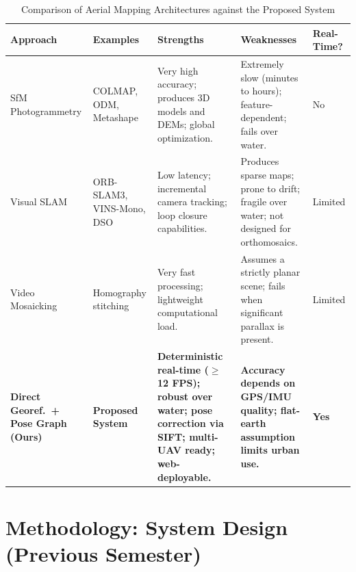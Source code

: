 \documentclass[conference]{IEEEtran}
\begin{document}
\begin{table}[ht]
    \centering
    \caption{Comparison of Aerial Mapping Architectures against the Proposed System}
    \label{tab:mapping_comparison}
    \small
    \renewcommand{\arraystretch}{1.2}
    \begin{tabularx}{\textwidth}{@{} p{2.8cm} p{2.2cm} X X l @{}}
        \toprule
        \textbf{Approach} & \textbf{Examples} & \textbf{Strengths} & \textbf{Weaknesses} & \textbf{Real-Time?} \\
        \midrule

        SfM Photogrammetry &
        COLMAP, ODM, Metashape &
        Very high accuracy; produces 3D models and DEMs; global optimization. &
        Extremely slow (minutes to hours); feature-dependent; fails over water. &
        No \\
        \addlinespace

        Visual SLAM &
        ORB-SLAM3, VINS-Mono, DSO &
        Low latency; incremental camera tracking; loop closure capabilities. &
        Produces sparse maps; prone to drift; fragile over water; not designed for orthomosaics. &
        Limited \\
        \addlinespace

        Video Mosaicking &
        Homography stitching &
        Very fast processing; lightweight computational load. &
        Assumes a strictly planar scene; fails when significant parallax is present. &
        Limited \\
        \addlinespace

        \textbf{Direct Georef.\ + Pose Graph (Ours)} &
        \textbf{Proposed System} &
        \textbf{Deterministic real-time ($\geq$12 FPS); robust over water; pose correction via SIFT; multi-UAV ready; web-deployable.} &
        \textbf{Accuracy depends on GPS/IMU quality; flat-earth assumption limits urban use.} &
        \textbf{Yes} \\

        \bottomrule
    \end{tabularx}
\end{table}


\section{Methodology: System Design (Previous Semester)}
\label{sec:methodology_prev}
\end{document}
